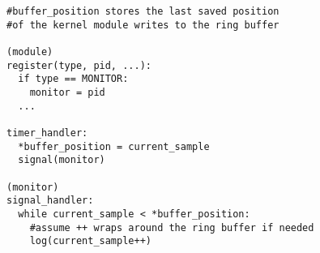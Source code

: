 \documentclass{article}
\begin{document}
\begin{verbatim}
#buffer_position stores the last saved position 
#of the kernel module writes to the ring buffer

(module)
register(type, pid, ...):
  if type == MONITOR:
    monitor = pid
  ...
  
timer_handler:
  *buffer_position = current_sample
  signal(monitor)
  
(monitor)
signal_handler:
  while current_sample < *buffer_position:
    #assume ++ wraps around the ring buffer if needed
    log(current_sample++)
\end{verbatim}
\end{document}
